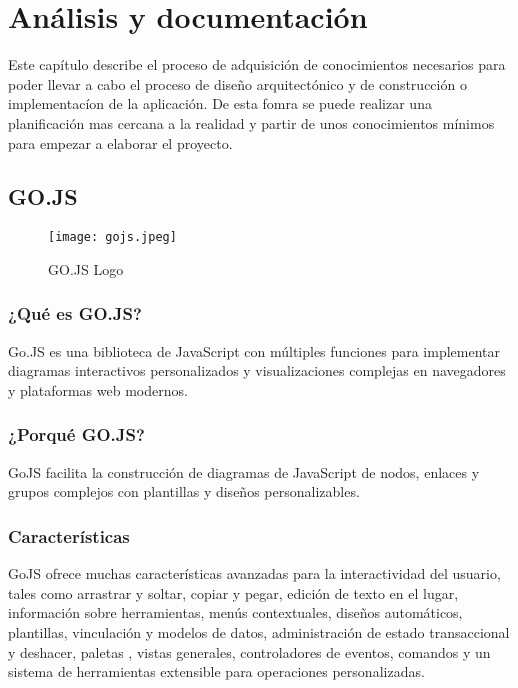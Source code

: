  \chapter{Análisis y documentación}
	 Este capítulo describe el proceso de adquisición de conocimientos necesarios para poder llevar a cabo el proceso de diseño arquitectónico y de construcción o implementacíon de la aplicación. De esta fomra se puede realizar una planificación mas cercana a la realidad y partir de unos conocimientos mínimos para empezar a elaborar el proyecto.
	 
	 \minitoc
	 
	 	\section{GO.JS}
	 		
	 		
	 		\begin{figure}[H]
	 			\centering
	 			\texttt{[image: gojs.jpeg]}
	 			\caption{GO.JS Logo}\label{fig:gojs}
	 		\end{figure}
	 	
	 	
	 		\subsection{¿Qué es GO.JS?}
	 			Go.JS \cite{gojs} es una biblioteca de JavaScript con múltiples funciones para implementar diagramas interactivos personalizados y visualizaciones complejas en navegadores y plataformas web modernos.
	 	
	 		\subsection{¿Porqué GO.JS?}
	 		 GoJS facilita la construcción de diagramas de JavaScript de nodos, enlaces y grupos complejos con plantillas y diseños personalizables.
	 		
	 		
	 		\subsection{Características}
	 		GoJS ofrece muchas características avanzadas para la interactividad del usuario, tales como arrastrar y soltar, copiar y pegar, edición de texto en el lugar, información sobre herramientas, menús contextuales, diseños automáticos, plantillas, vinculación y modelos de datos, administración de estado transaccional y deshacer, paletas , vistas generales, controladores de eventos, comandos y un sistema de herramientas extensible para operaciones personalizadas.
	 		

